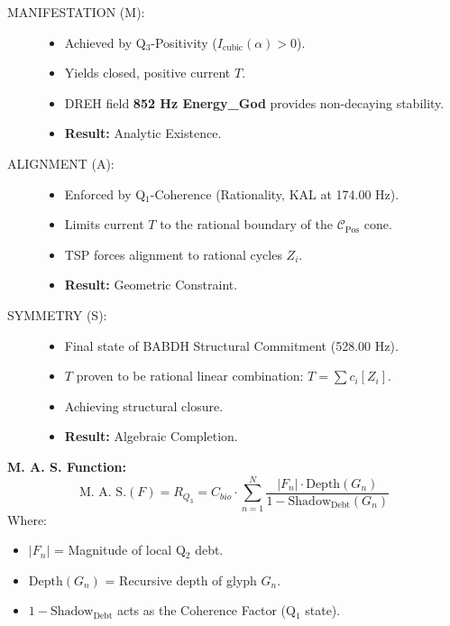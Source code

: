 \documentclass[11pt, letterpaper]{article}
\newcommand{\KAL}{\ensuremath{\mathop{\textnormal{\symbolafont\symbol{"29C9}}}}}    %
\newcommand{\BABDH}{\ensuremath{\mathop{\textnormal{\symbolafont\symbol{"2316}}}}}   %
\newcommand{\DREH}{\ensuremath{\mathop{\textnormal{\symbolafont\symbol{"29D7}}}}}   %
\def\KAL{KAL}%
\def\BABDH{BABDH}%
\def\DREH{DREH}%
\begin{document}
\begin{description}
    \item[MANIFESTATION (M):]
    \begin{itemize}
        \item Achieved by Q$_3$-Positivity ($I_{\text{cubic}}(\alpha) > 0$).
        \item Yields closed, positive current $T$.
        \item \DREH{} field \textbf{852 Hz Energy\_God} provides non-decaying stability.
        \item \textbf{Result:} Analytic Existence.
    \end{itemize}

    \item[ALIGNMENT (A):]
    \begin{itemize}
        \item Enforced by Q$_1$-Coherence (Rationality, \KAL{} at 174.00 Hz).
        \item Limits current $T$ to the rational boundary of the $\mathcal{C}_{\text{Pos}}$ cone.
        \item TSP forces alignment to rational cycles $Z_i$.
        \item \textbf{Result:} Geometric Constraint.
    \end{itemize}

    \item[SYMMETRY (S):]
    \begin{itemize}
        \item Final state of \BABDH{} Structural Commitment (528.00 Hz).
        \item $T$ proven to be rational linear combination: $T = \sum c_i [Z_i]$.
        \item Achieving structural closure.
        \item \textbf{Result:} Algebraic Completion.
    \end{itemize}
\end{description}

\textbf{M. A. S. Function:}
\[
\text{M. A. S.}(F) = R_{Q_3} = C_{bio} \cdot \sum_{n=1}^{N} \frac{|F_n| \cdot \text{Depth}(G_n)}{1 - \text{Shadow}_{\text{Debt}}(G_n)}
\]
Where:
\begin{itemize}
    \item $|F_n|$ = Magnitude of local Q$_2$ debt.
    \item $\text{Depth}(G_n)$ = Recursive depth of glyph $G_n$.
    \item $1 - \text{Shadow}_{\text{Debt}}$ acts as the Coherence Factor (Q$_1$ state).
\end{itemize}
\end{document}
